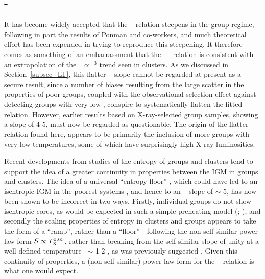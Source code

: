 \documentclass[usenatbib]{mn2e}
\begin{document}
\subsection{\LX-\TX}

It has become widely accepted that the \LX-\TX\ relation steepens in the group
regime, following in part the results of Ponman and co-workers, and much
theoretical effort has been expended in trying to reproduce this steepening.  It
therefore comes as something of an embarrassment that the \GEMS\ \LX-\TX\ relation
is consistent with an extrapolation of the \LX\ $\propto$ \TX$^3$ trend seen in
clusters.  As we discussed in Section~\ref{subsec_LT}, this flatter \LX-\TX\
slope cannot be regarded at present as a secure result, since a number of biases
resulting from the large scatter in the properties of poor groups, coupled with
the observational selection effect against detecting groups with very low \LX,
conspire to systematically flatten the fitted relation.  However, earlier results
\citep[e.g.][]{helsdon00b} based on X-ray-selected group samples, showing a slope
of 4-5, must now be regarded as questionable.  The origin of the flatter relation
found here, appears to be primarily the inclusion of more groups with very low
temperatures, some of which have surprisingly high X-ray luminosities.

Recent developments from studies of the entropy of groups and clusters tend to
support the idea of a greater continuity in properties between the IGM in groups
and clusters.  The idea of a universal ``entropy floor'' \citep{ponman99}, which
could have led to an isentropic IGM in the poorest systems \citep{babul02}, and
hence to an \LX-\TX\ slope of $\sim$ 5, has now been shown to be incorrect in two
ways.  Firstly, individual groups do not show isentropic cores, as would be
expected in such a simple preheating model 
(\citealt{pratt03,ponman03,sun03,mushotsky03,rasmussen04};
\citealt*{khosroshahi04b}), and secondly the scaling properties of entropy in
clusters and groups appears to take the form of a ``ramp'', rather than a
``floor'' \citep{ponman03} - following the non-self-similar power law form $S
\propto T_{\mathrm{X}}^{0.65}$, rather than breaking from the self-similar slope of unity at
a well-defined temperature \TX\ $\sim$ 1-2 \kev, as was previously suggested
\citep*{lloyddavies00}.  Given this continuity of properties, a
(non-self-similar) power law form for the \LX-\TX\ relation is what one would
expect.

\end{document}
